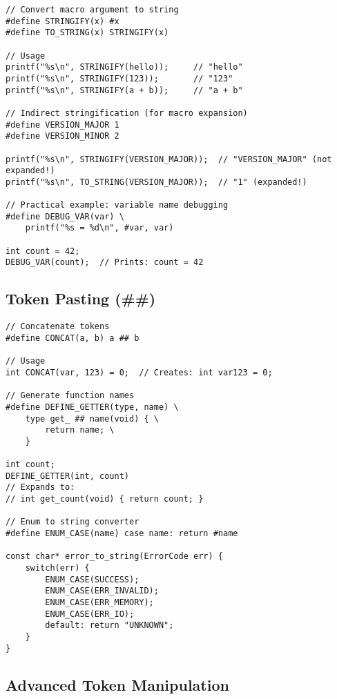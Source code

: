 \begin{lstlisting}
// Convert macro argument to string
#define STRINGIFY(x) #x
#define TO_STRING(x) STRINGIFY(x)

// Usage
printf("%s\n", STRINGIFY(hello));     // "hello"
printf("%s\n", STRINGIFY(123));       // "123"
printf("%s\n", STRINGIFY(a + b));     // "a + b"

// Indirect stringification (for macro expansion)
#define VERSION_MAJOR 1
#define VERSION_MINOR 2

printf("%s\n", STRINGIFY(VERSION_MAJOR));  // "VERSION_MAJOR" (not expanded!)
printf("%s\n", TO_STRING(VERSION_MAJOR));  // "1" (expanded!)

// Practical example: variable name debugging
#define DEBUG_VAR(var) \
    printf("%s = %d\n", #var, var)

int count = 42;
DEBUG_VAR(count);  // Prints: count = 42
\end{lstlisting}

\subsection{Token Pasting (\#\#)}

\begin{lstlisting}
// Concatenate tokens
#define CONCAT(a, b) a ## b

// Usage
int CONCAT(var, 123) = 0;  // Creates: int var123 = 0;

// Generate function names
#define DEFINE_GETTER(type, name) \
    type get_ ## name(void) { \
        return name; \
    }

int count;
DEFINE_GETTER(int, count)
// Expands to:
// int get_count(void) { return count; }

// Enum to string converter
#define ENUM_CASE(name) case name: return #name

const char* error_to_string(ErrorCode err) {
    switch(err) {
        ENUM_CASE(SUCCESS);
        ENUM_CASE(ERR_INVALID);
        ENUM_CASE(ERR_MEMORY);
        ENUM_CASE(ERR_IO);
        default: return "UNKNOWN";
    }
}
\end{lstlisting}

\subsection{Advanced Token Manipulation}

